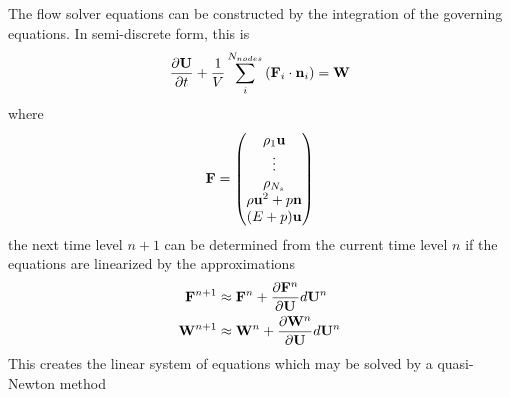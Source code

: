 \documentclass[a4paper]{report}
\begin{document}
The flow solver equations can be constructed by the integration of the governing
equations.  In semi-discrete form, this is 
\begin{equation}
  \frac{\partial \mathbf U}{\partial t} + \frac{1}{V} \sum_{i}^{N_{nodes}}
  \left( \mathbf F_i \cdot \mathbf{n}_i \right) = \mathbf W
  \label{semi-discrete}
\end{equation}
where
\begin{equation}
  \mathbf F = 
  \begin{pmatrix}
    \rho_1 \mathbf u \\
    \vdots \\
    \rho_{N_s} \\
    \rho \mathbf u^2 + p\mathbf{n} \\
    (E + p) \mathbf u
  \end{pmatrix}
  \label{f-vec}
\end{equation}
the next time level $n+1$ can be determined from the current time level
$n$ if the equations are linearized by the approximations
\begin{equation}
  \begin{aligned}
    \mathbf F^{n+1} &\approx \mathbf F^{n} + \frac{\partial \mathbf F^{n}}{\partial \mathbf U} d \mathbf U^{n} \\
    \mathbf W^{n+1} &\approx \mathbf W^{n} + \frac{\partial \mathbf W^{n}}{\partial \mathbf U} d \mathbf U^{n}
  \end{aligned}
  \label{linearization-flux}
\end{equation}
This creates the linear system of equations which may be solved by a
quasi-Newton method
\end{document}

